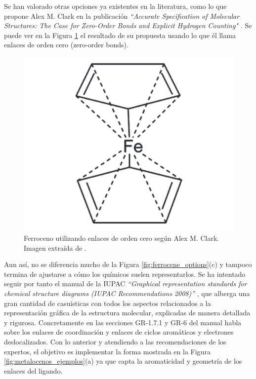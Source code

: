 Se han valorado otras opciones ya existentes en la literatura, como lo que propone Alex M. Clark en la publicación \textit{``Accurate Specification of Molecular Structures: The Case for Zero-Order Bonds and Explicit Hydrogen Counting"} \cite{zero_order}. Se puede ver en la Figura \ref{fig:zero_bond_ferrocene} el resultado de su propuesta usando lo que él llama enlaces de orden cero (zero-order bonds). 
\begin{figure}[h!]
    \centering
    \includegraphics[scale=0.4]{imagenes/diseno/dibujo/zero_bond_orders_ferrocene.png}
    \caption{Ferroceno utilizando enlaces de orden cero según Alex M. Clark. Imagen extraída de \cite{zero_order}.}
    \label{fig:zero_bond_ferrocene}
\end{figure}

Aun así, no se diferencia mucho de la Figura \ref{fig:ferrocene_options}(c) y tampoco termina de ajustarse a cómo los químicos suelen representarlos. Se ha intentado seguir por tanto el manual de la IUPAC \textit{``Graphical representation standards for chemical structure diagrams (IUPAC Recommendations 2008)''} \cite{iupac_manual}, que alberga una gran cantidad de casuísticas con todos los aspectos relacionados a la representación gráfica de la estructura molecular, explicadas de manera detallada y rigurosa. Concretamente en las secciones GR-1.7.1 y GR-6 del manual habla sobre los enlaces de coordinación y enlaces de ciclos aromáticos y electrones deslocalizados. Con lo anterior y atendiendo a las recomendaciones de los expertos, el objetivo es implementar la forma mostrada en la Figura \ref{fig:metalocenos_ejemplos}(a) ya que capta la aromaticidad y geometría de los enlaces del ligando.


